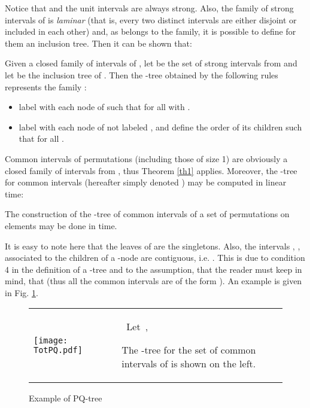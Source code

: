 \documentclass{article}
\begin{document}
Notice that   and the unit intervals are always strong. Also,  the family 
of strong  intervals of  is \emph{laminar} (that is, 
every two distinct intervals are either disjoint or included in each other) 
and, as  belongs to the family, it is possible to define for them an inclusion tree.
Then it can be shown that:

\begin{theorem}
\label{th1}
Given a closed family  of  intervals of , let  be the set of strong intervals from  and let
 be the inclusion tree of . Then the -tree obtained by the following rules 
represents the family :
\begin{itemize}
\item[1.] label with  each node  of  such that  for all 
  with .
\item[2.] label with  each node  of  not labeled , and define the order 
of its children such that  for all .  
\end{itemize}

\end{theorem}

Common intervals of permutations (including those of size 1) are obviously a closed family of intervals from , thus 
Theorem \ref{th1} applies. 
Moreover, the -tree for common intervals (hereafter simply denoted ) may be computed in linear time:

\begin{theorem}\citet{BCMR05}
The construction of the -tree  of common  intervals of a set  of
 permutations on  elements may be done in  time.
\end{theorem}

It is easy to note here that the leaves of  are the singletons. Also,  the intervals
, , associated to the children of a -node are contiguous, 
i.e. . This is due to condition 4 in the definition of a
-tree and to the assumption, that the reader must keep in mind, that  (thus
all the common intervals are of the form ). An example is given in Fig. \ref{figtotal2b}.



\begin{figure}[t]
 \begin{center}
\begin{tabular}{p{4cm}lp{4cm}} 
\vspace {-.8 cm}\texttt{[image: TotPQ.pdf]}&
\phantom{xxxxxxxx} & 
\mbox{  Let ,}\hfill \linebreak \centerline{} \centerline{}
 The -tree for the set of common intervals of  is shown on the left.
\\
\end{tabular}
 \end{center}\vspace{-.3cm}
\caption{Example of PQ-tree}
 \label{figtotal2b}
\end{figure}
\end{document}
